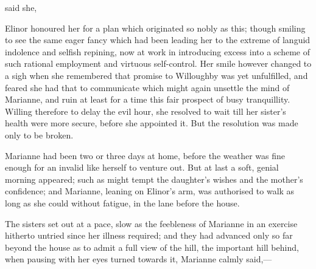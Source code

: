  said she, 

Elinor honoured her for a plan which originated so nobly as this; though smiling to see the same eager fancy which had been leading her to the extreme of languid indolence and selfish repining, now at work in introducing excess into a scheme of such rational employment and virtuous self-control. Her smile however changed to a sigh when she remembered that promise to Willoughby was yet unfulfilled, and feared she had that to communicate which might again unsettle the mind of Marianne, and ruin at least for a time this fair prospect of busy tranquillity. Willing therefore to delay the evil hour, she resolved to wait till her sister's health were more secure, before she appointed it. But the resolution was made only to be broken.

Marianne had been two or three days at home, before the weather was fine enough for an invalid like herself to venture out. But at last a soft, genial morning appeared; such as might tempt the daughter's wishes and the mother's confidence; and Marianne, leaning on Elinor's arm, was authorised to walk as long as she could without fatigue, in the lane before the house.

The sisters set out at a pace, slow as the feebleness of Marianne in an exercise hitherto untried since her illness required; and they had advanced only so far beyond the house as to admit a full view of the hill, the important hill behind, when pausing with her eyes turned towards it, Marianne calmly said,---

